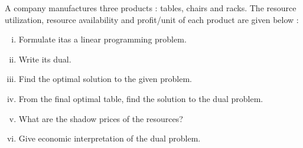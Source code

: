 \begin{frameExample}{}{}
  A company manufactures three products : tables, chairs and racks. The resource utilization, resource availability and profit/unit of each product are given below :


  {\centering
  \par}

\begin{enumerate}[i)]
\item  Formulate itas a linear programming problem.
\item  Write its dual.
\item  Find the optimal solution to the given problem.
\item  From the final optimal table, find the solution to the dual problem.
\item  What are the shadow prices of the resources?
\item  Give economic interpretation of the dual problem.
\end{enumerate}
  
\end{frameExample}

